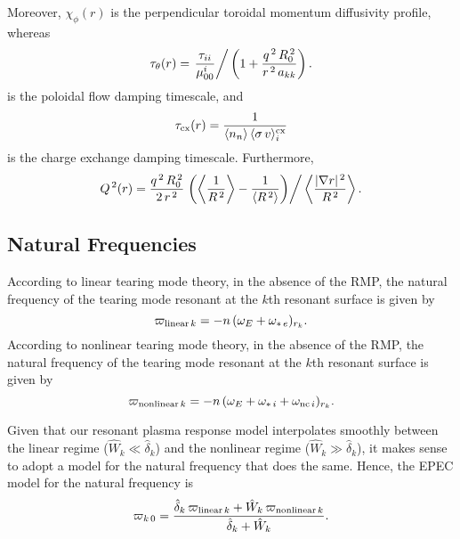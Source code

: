 \documentclass[notitlepage,12pt]{article}
\begin{document}
Moreover, $\chi_\phi(r)$ is the perpendicular toroidal momentum diffusivity profile, whereas
\begin{equation}\label{a70}
\tau_\theta(r) = \left. \frac{\tau_{ii}}{\mu_{00}^i}\right/\left(1+\frac{q^{\,2}\,R_0^{\,2}}{r^{\,2}\,a_{kk}}\right).
\end{equation}
is the poloidal flow damping timescale, 
and
\begin{equation}
\tau_{\rm cx}(r)=\frac{1}{\langle n_n\rangle\,\langle \sigma\,v\rangle_i^{\rm cx}}
\end{equation}
is the charge exchange damping timescale. 
Furthermore,
\begin{equation}\label{a71}
Q^{\,2}(r) =\frac{q^{\,2}\,R_0^{\,2}}{2\,r^{\,2}}\left.\left(\left\langle\frac{1}{R^{\,2}}\right\rangle-\frac{1}{\langle R^{\,2}\rangle}\right)\right/\left\langle \frac{|\nabla r|^{\,2}}{R^{\,2}}\right\rangle.
\end{equation}

\subsection{Natural Frequencies}
According to linear tearing mode theory, in the absence of the RMP, the natural frequency of the tearing mode resonant at the $k$th resonant surface is given by
\begin{equation}\label{elin}
 \varpi_{{\rm linear}\,k} = - n\,(\omega_E+\omega_{\ast\,e})_{r_k}.
\end{equation}
According to nonlinear tearing mode theory, in the absence of the RMP, 
the natural frequency of the tearing mode resonant at the $k$th resonant surface is given by
\begin{equation}\label{e28y}
 \varpi_{{\rm nonlinear}\,k}=  -n\,(\omega_E+\omega_{\ast\,i}+\omega_{{\rm nc}\,i})_{r_k}.
 \end{equation}

Given that our resonant plasma response model interpolates smoothly between the linear regime ($\hat{W}_k\ll \hat{\delta}_k$) and the nonlinear
regime ($\hat{W}_k\gg \hat{\delta}_k$), it makes sense to adopt a model for the natural frequency that does the same. Hence, the EPEC model for the natural frequency is
\begin{equation}\label{ecomp}
\varpi_{k\,0} = \frac{\hat{\delta}_k\,\varpi_{{\rm linear}\,k} +\hat{W}_k\,\varpi_{{\rm nonlinear}\,k}}{\hat{\delta}_k+\hat{W}_k}.
\end{equation}
\end{document}
